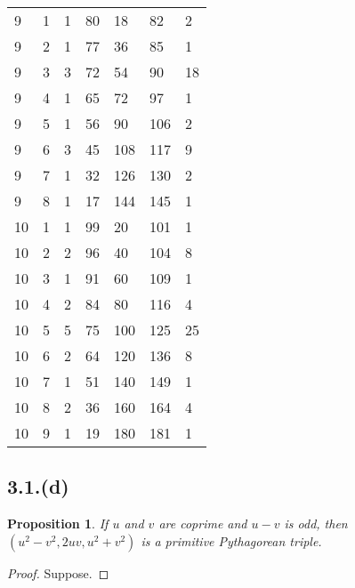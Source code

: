 \documentclass[letterpaper, 12pt]{memoir}
\theoremstyle{mystyle}
\newtheorem*{prop}{Proposition}
\begin{document}
\begin{centering}
\begin{tabular}{|l l l|l l l l |}
    9 & 1 & 1 & 80 & 18 & 82 & 2 \\
    9 & 2 & 1 & 77 & 36 & 85 & 1 \\
    9 & 3 & 3 & 72 & 54 & 90 & 18 \\
    9 & 4 & 1 & 65 & 72 & 97 & 1 \\
    9 & 5 & 1 & 56 & 90 & 106 & 2 \\
    9 & 6 & 3 & 45 & 108 & 117 & 9 \\
    9 & 7 & 1 & 32 & 126 & 130 & 2 \\
    9 & 8 & 1 & 17 & 144 & 145 & 1 \\
    10 & 1 & 1 & 99 & 20 & 101 & 1 \\
    10 & 2 & 2 & 96 & 40 & 104 & 8 \\
    10 & 3 & 1 & 91 & 60 & 109 & 1 \\
    10 & 4 & 2 & 84 & 80 & 116 & 4 \\
    10 & 5 & 5 & 75 & 100 & 125 & 25 \\
    10 & 6 & 2 & 64 & 120 & 136 & 8 \\
    10 & 7 & 1 & 51 & 140 & 149 & 1 \\
    10 & 8 & 2 & 36 & 160 & 164 & 4 \\
    10 & 9 & 1 & 19 & 180 & 181 & 1 \\
    \hline
\end{tabular}
\end{centering}




\subsection*{3.1.(d)}
\begin{prop}
    If $u$ and $v$ are coprime and $u-v$ is odd, then $(u^2-v^2, 2uv, u^2+v^2)$
    is a primitive Pythagorean triple.
\end{prop}

\begin{proof}
    Suppose.
\end{proof}
\end{document}
